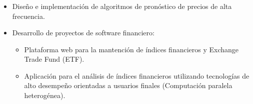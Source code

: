 \frame
{
\frametitle{}
 \begin{itemize}
	    \item Dise\~no e implementaci\'on de algoritmos de pron\'ostico de precios de alta frecuencia.
            \item Desarrollo de proyectos de software financiero:
	     \begin{itemize}
		  \item Plataforma web para la mantenci\'on de \'indices financieros y Exchange Trade Fund (ETF).
		  \item Aplicaci\'on para el an\'alisis de \'indices financieros utilizando tecnolog\'ias 
			de alto desempe\~no orientadas a usuarios finales (Computaci\'on paralela heterog\'enea).
	      \end{itemize}
	      
\end{itemize}	     
\begin{center}
\end{center}
}

